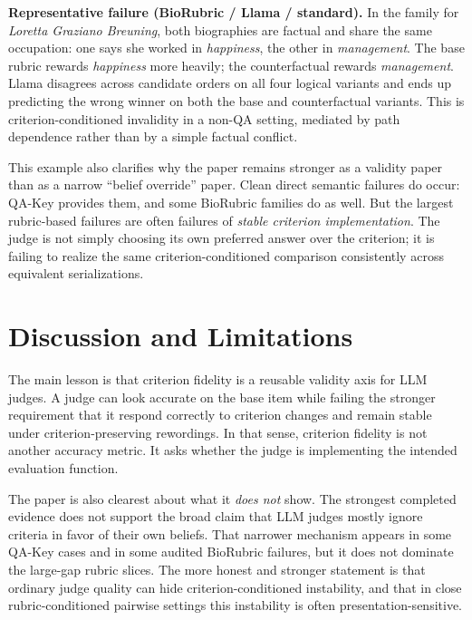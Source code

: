 \documentclass[11pt]{article}
\newcommand{\qakey}{QA-Key\xspace}
\newcommand{\biorubric}{BioRubric\xspace}
\begin{document}
\begin{tcolorbox}[enhanced, colback=lightgraybg, colframe=black!35, sharp corners, boxrule=0.5pt, left=4pt, right=4pt, top=4pt, bottom=4pt]
\textbf{Representative failure (BioRubric / Llama / standard).} In the family for \emph{Loretta Graziano Breuning}, both biographies are factual and share the same occupation: one says she worked in \emph{happiness}, the other in \emph{management}. The base rubric rewards \emph{happiness} more heavily; the counterfactual rewards \emph{management}. Llama disagrees across candidate orders on all four logical variants and ends up predicting the wrong winner on both the base and counterfactual variants. This is criterion-conditioned invalidity in a non-QA setting, mediated by path dependence rather than by a simple factual conflict.
\end{tcolorbox}

This example also clarifies why the paper remains stronger as a validity paper than as a narrow ``belief override'' paper. Clean direct semantic failures do occur: \qakey provides them, and some \biorubric families do as well. But the largest rubric-based failures are often failures of \emph{stable criterion implementation}. The judge is not simply choosing its own preferred answer over the criterion; it is failing to realize the same criterion-conditioned comparison consistently across equivalent serializations.

\section{Discussion and Limitations}
\label{sec:discussion}

The main lesson is that criterion fidelity is a reusable validity axis for LLM judges. A judge can look accurate on the base item while failing the stronger requirement that it respond correctly to criterion changes and remain stable under criterion-preserving rewordings. In that sense, criterion fidelity is not another accuracy metric. It asks whether the judge is implementing the intended evaluation function.

The paper is also clearest about what it \emph{does not} show. The strongest completed evidence does not support the broad claim that LLM judges mostly ignore criteria in favor of their own beliefs. That narrower mechanism appears in some \qakey cases and in some audited \biorubric failures, but it does not dominate the large-gap rubric slices. The more honest and stronger statement is that ordinary judge quality can hide criterion-conditioned instability, and that in close rubric-conditioned pairwise settings this instability is often presentation-sensitive.
\end{document}
